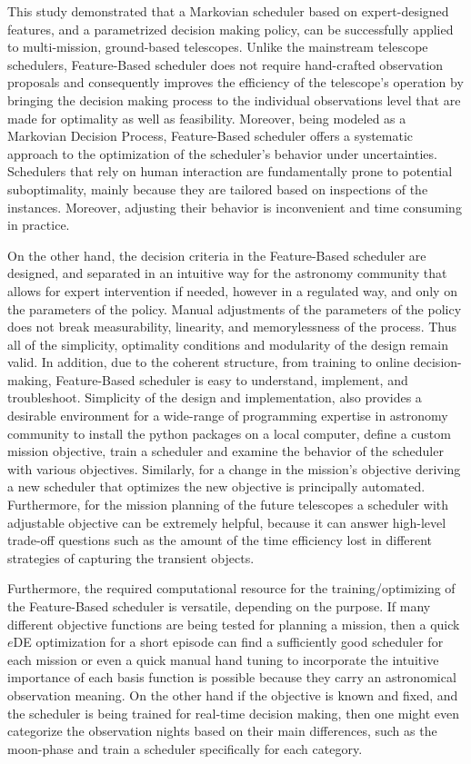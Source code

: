 \documentclass[12pt,aas_macros]{article}
\theoremstyle{definition}
\begin{document}
This study demonstrated that a Markovian scheduler based on expert-designed features, and a parametrized decision making policy, can be successfully applied to multi-mission, ground-based telescopes. Unlike the mainstream telescope schedulers, Feature-Based scheduler does not require hand-crafted observation proposals and consequently improves the efficiency of the telescope's operation by bringing the decision making process to the individual observations level that are made for optimality as well as feasibility. Moreover, being modeled as a Markovian Decision Process, Feature-Based scheduler offers a systematic approach to the optimization of the scheduler's behavior under uncertainties. Schedulers that rely on human interaction are fundamentally prone to potential suboptimality, mainly because they are tailored based on inspections of the instances. Moreover, adjusting their behavior is inconvenient and time consuming in practice. 


On the other hand, the decision criteria in the Feature-Based scheduler are designed, and separated in an intuitive way for the astronomy community that allows for expert intervention if needed, however in a regulated way, and only on the parameters of the policy. Manual adjustments of the parameters of the policy does not break measurability, linearity, and memorylessness of the process. Thus all of the simplicity, optimality conditions and modularity of the design remain valid. In addition, due to the coherent structure, from training to online decision-making, Feature-Based scheduler is easy to understand, implement, and troubleshoot. Simplicity of the design and implementation, also provides a desirable environment for a wide-range of programming expertise in astronomy community to install the python packages on a local computer, define a custom mission objective, train a scheduler and examine the behavior of the scheduler with various objectives. Similarly, for a change in the mission's objective deriving a new scheduler that optimizes the new objective is principally automated. Furthermore, for the mission planning of the future telescopes a scheduler with adjustable objective can be extremely helpful, because it can answer high-level trade-off questions such as the amount of the time efficiency lost in different strategies of capturing the transient objects. 

Furthermore, the required computational resource for the training/optimizing of the Feature-Based scheduler is versatile, depending on the purpose. If many different objective functions are being tested for planning a mission, then a quick $e$DE optimization for a short episode can find a sufficiently good scheduler for each mission or even a quick manual hand tuning to incorporate the intuitive importance of each basis function is possible because they carry an astronomical observation meaning. On the other hand if the objective is known and fixed, and the scheduler is being trained for real-time decision making, then one might even categorize the observation nights based on their main differences, such as the moon-phase and train a scheduler specifically for each category. 
\end{document}
